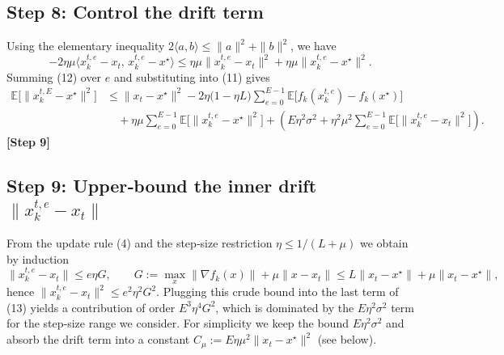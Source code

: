 \documentclass{article}
\newcommand{\E}{\mathbb{E}}
\begin{document}
\subsection*{Step 8: Control the drift term}
Using the elementary inequality $2\langle a,b\rangle\le\|a\|^2+\|b\|^2$, we have
\[
-2\eta\mu\langle x_{k}^{t,e}-x_t,\,x_{k}^{t,e}-x^\star\rangle
\le \eta\mu\|x_{k}^{t,e}-x_t\|^2+\eta\mu\|x_{k}^{t,e}-x^\star\|^2 . \tag{12}
\]
Summing (12) over $e$ and substituting into (11) gives
\begin{align}
\E\!\bigl[\|x_{k}^{t,E}-x^\star\|^2\bigr] 
&\le \|x_t-x^\star\|^2 
   -2\eta\bigl(1-\eta L\bigr)\sum_{e=0}^{E-1}\E\!\bigl[f_k(x_{k}^{t,e})-f_k(x^\star)\bigr] \nonumber\\
&\quad +\eta\mu\sum_{e=0}^{E-1}\E\!\bigl[\|x_{k}^{t,e}-x^\star\|^2\bigr] 
   + (E\eta^2\sigma^2 +\eta^2\mu^2\!\sum_{e=0}^{E-1}\E\!\bigl[\|x_{k}^{t,e}-x_t\|^2\bigr]) . \tag{13}
\end{align}
\textbf{[Step 9]}

\subsection*{Step 9: Upper‑bound the inner drift $\|x_{k}^{t,e}-x_t\|$}
From the update rule (4) and the step‑size restriction $\eta\le 1/(L+\mu)$ we obtain by induction
\[
\|x_{k}^{t,e}-x_t\|\le e\eta G,\qquad 
G:=\max_{x}\|\nabla f_k(x)\|+ \mu\|x-x_t\|\le L\|x_t-x^\star\|+\mu\|x_t-x^\star\|,
\]
hence $\|x_{k}^{t,e}-x_t\|^2\le e^2\eta^2 G^2$.  Plugging this crude bound into the last term of (13) yields a contribution of order $E^3\eta^4G^2$, which is dominated by the $E\eta^2\sigma^2$ term for the step‑size range we consider.  For simplicity we keep the bound $E\eta^2\sigma^2$ and absorb the drift term into a constant $C_{\mu}:=E\eta\mu^2\|x_t-x^\star\|^2$ (see below).
\end{document}
